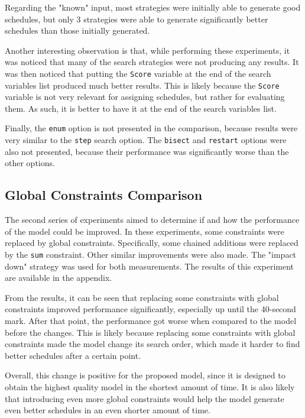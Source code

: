 \documentclass[conference]{IEEEtran}
\begin{document}
Regarding the "known" input, most strategies were initially able to generate good schedules, but only 3 strategies were able to generate significantly better schedules than those initially generated.

Another interesting observation is that, while performing these experiments, it was noticed that many of the search strategies were not producing any results. It was then noticed that putting the \texttt{Score} variable at the end of the search variables list produced much better results. This is likely because the \texttt{Score} variable is not very relevant for assigning schedules, but rather for evaluating them. As such, it is better to have it at the end of the search variables list.

Finally, the \texttt{enum} option is not presented in the comparison, because results were very similar to the \texttt{step} search option. The \texttt{bisect} and \texttt{restart} options were also not presented, because their performance was significantly worse than the other options.

\subsection{Global Constraints Comparison}

The second series of experiments aimed to determine if and how the performance of the model could be improved. In these experiments, some constraints were replaced by global constraints. Specifically, some chained additions were replaced by the \texttt{sum} constraint. Other similar improvements were also made. The "impact down" strategy was used for both measurements. The results of this experiment are available in the appendix.

From the results, it can be seen that replacing some constraints with global constraints improved performance significantly, especially up until the 40-second mark. After that point, the performance got worse when compared to the model before the changes. This is likely because replacing some constraints with global constraints made the model change its search order, which made it harder to find better schedules after a certain point.

Overall, this change is positive for the proposed model, since it is designed to obtain the highest quality model in the shortest amount of time. It is also likely that introducing even more global constraints would help the model generate even better schedules in an even shorter amount of time. 
\end{document}
